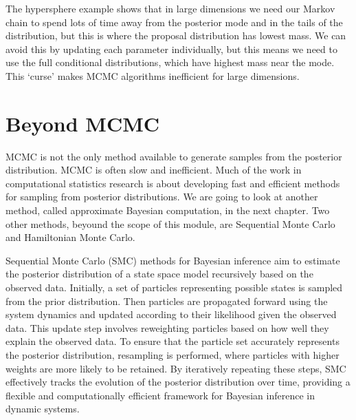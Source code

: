 \documentclass[
]{book}
\theoremstyle{definition}
\theoremstyle{definition}
\theoremstyle{definition}
\theoremstyle{definition}
\theoremstyle{remark}
\begin{document}
The hypersphere example shows that in large dimensions we need our Markov chain to spend lots of time away from the posterior mode and in the tails of the distribution, but this is where the proposal distribution has lowest mass. We can avoid this by updating each parameter individually, but this means we need to use the full conditional distributions, which have highest mass near the mode. This `curse' makes MCMC algorithms inefficient for large dimensions.

\hypertarget{beyond-mcmc}{%
\section{Beyond MCMC}\label{beyond-mcmc}}

MCMC is not the only method available to generate samples from the posterior distribution. MCMC is often slow and inefficient. Much of the work in computational statistics research is about developing fast and efficient methods for sampling from posterior distributions. We are going to look at another method, called approximate Bayesian computation, in the next chapter. Two other methods, beyound the scope of this module, are Sequential Monte Carlo and Hamiltonian Monte Carlo.

Sequential Monte Carlo (SMC) methods for Bayesian inference aim to estimate the posterior distribution of a state space model recursively based on the observed data. Initially, a set of particles representing possible states is sampled from the prior distribution. Then particles are propagated forward using the system dynamics and updated according to their likelihood given the observed data. This update step involves reweighting particles based on how well they explain the observed data. To ensure that the particle set accurately represents the posterior distribution, resampling is performed, where particles with higher weights are more likely to be retained. By iteratively repeating these steps, SMC effectively tracks the evolution of the posterior distribution over time, providing a flexible and computationally efficient framework for Bayesian inference in dynamic systems.
\end{document}
